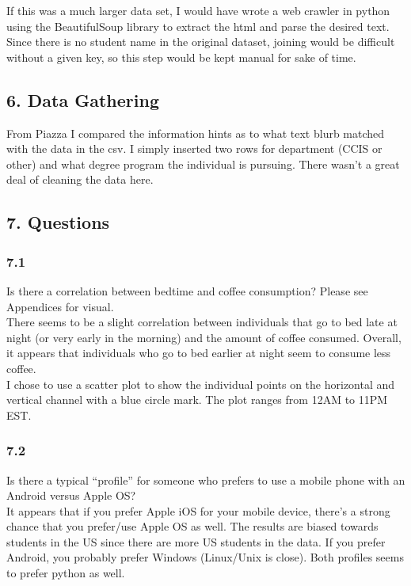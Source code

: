 \documentclass{neu_handout}
\begin{document}
If this was a much larger data set, I would have wrote a web crawler in python using the BeautifulSoup library to extract the html and parse the desired text. Since there is no student name in the original dataset, joining would be difficult without a given key, so this step would be kept manual for sake of time.

\subsection*{6. Data Gathering}
From Piazza I compared the information hints as to what text blurb matched with the data in the csv. I simply inserted two rows for department (CCIS or other) and what degree program the individual is pursuing. There wasn't a great deal of cleaning the data here.

\subsection*{7. Questions}

\subsubsection*{7.1}
Is there a correlation between bedtime and coffee consumption? Please see Appendices for visual.\\

There seems to be a slight correlation between individuals that go to bed late at night (or very early in the morning) and the amount of coffee consumed. Overall, it appears that individuals who go to bed earlier at night seem to consume less coffee.\\

I chose to use a scatter plot to show the individual points on the horizontal and vertical channel with a blue circle mark. The plot ranges from 12AM to 11PM EST.

\subsubsection*{7.2}
Is there a typical “profile” for someone who prefers to use a mobile phone with an Android versus Apple OS?\\

It appears that if you prefer Apple iOS for your mobile device, there's a strong chance that you prefer/use Apple OS as well. The results are biased towards students in the US since there are more US students in the data. If you prefer Android, you probably prefer Windows (Linux/Unix is close). Both profiles seems to prefer python as well.
\end{document}
